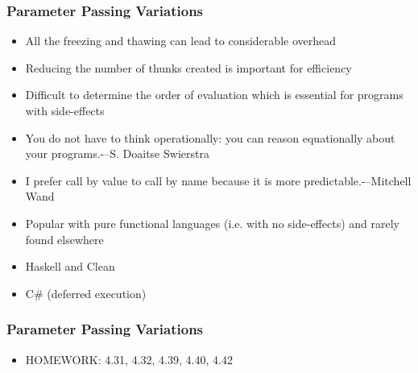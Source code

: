 \documentclass{beamer}
\begin{document}
\begin{frame}[fragile]
\frametitle{Parameter Passing Variations}
\begin{scriptsize}
\begin{itemize}
\item<1-> All the freezing and thawing can lead to considerable overhead

\item<1-> Reducing the number of thunks created is important for efficiency

\item<2-> Difficult to determine the order of evaluation which is essential for programs with side-effects

\item<3-> You do not have to think operationally: you can reason equationally about your programs.-–S. Doaitse Swierstra
\item<3-> I prefer call by value to call by name because it is more predictable.-–Mitchell Wand

\item<4-> Popular with pure functional languages (i.e. with no side-effects) and rarely found elsewhere
    
\item<4-> Haskell and Clean	
		
\item<4-> C\# (deferred execution)

\end{itemize}
\end{scriptsize}
\end{frame}

\begin{frame}[fragile]
\frametitle{Parameter Passing Variations}
\begin{scriptsize}
\begin{itemize}
\item<1-> HOMEWORK: 4.31, 4.32, 4.39, 4.40, 4.42

\end{itemize}
\end{scriptsize}
\end{frame}
\end{document}
